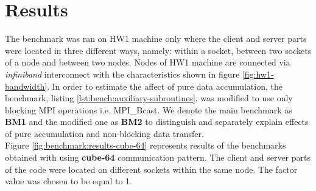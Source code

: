 \section{Results}
\label{sec:accumulator-results}


The benchmark was ran on HW1 machine only where the client and server parts were located in three different ways, namely: within a socket, between two sockets of a node and between two nodes. Nodes of HW1 machine are connected via \textit{infiniband} interconnect with the characteristics shown in figure \ref{fig:hw1-bandwidth}. In order to estimate the affect of pure data accumulation, the benchmark, listing \ref{lst:bench:auxiliary-subroutines}, was modified to use only blocking MPI operations i.e. MPI\_Bcast. We denote the main benchmark as \textbf{BM1} and the modified one as \textbf{BM2} to distinguish and separately explain effects of pure accumulation and non-blocking data transfer.\\


Figure \ref{fig:benchmark:results-cube-64} represents results of the benchmarks obtained with using \textbf{cube-64} communication pattern. The client and server parts of the code were located on different sockets within the same node. The factor value was chosen to be equal to 1.\\


